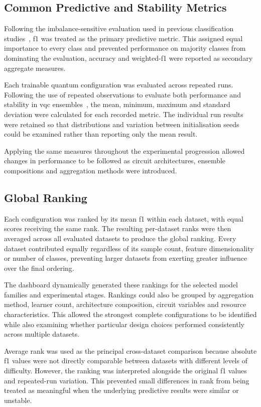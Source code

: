 \documentclass[]{UCD_CS_MSc_AAI_Report}
\begin{document}
\subsection{Common Predictive and Stability Metrics}

Following the imbalance-sensitive evaluation used in previous classification studies~\cite{demir_modified_2018,vasan_exploring_2025}, \acl{f1} was treated as the primary predictive metric. This assigned equal importance to every class and prevented performance on majority classes from dominating the evaluation, accuracy and weighted-\acs{f1} were reported as secondary aggregate measures.

Each trainable quantum configuration was evaluated across repeated runs. Following the use of repeated observations to evaluate both performance and stability in \ac{vqc} ensembles~\cite{radojicic_reducing_2026}, the mean, minimum, maximum and standard deviation were calculated for each recorded metric. The individual run results were retained so that distributions and variation between initialisation seeds could be examined rather than reporting only the mean result.

Applying the same measures throughout the experimental progression allowed changes in performance to be followed as circuit architectures, ensemble compositions and aggregation methods were introduced.

\subsection{Global Ranking}

Each configuration was ranked by its mean \acl{f1} within each dataset, with equal scores receiving the same rank. The resulting per-dataset ranks were then averaged across all evaluated datasets to produce the global ranking. Every dataset contributed equally regardless of its sample count, feature dimensionality or number of classes, preventing larger datasets from exerting greater influence over the final ordering.

The dashboard dynamically generated these rankings for the selected model families and experimental stages. Rankings could also be grouped by aggregation method, learner count, architecture composition, circuit variables and resource characteristics. This allowed the strongest complete configurations to be identified while also examining whether particular design choices performed consistently across multiple datasets.

Average rank was used as the principal cross-dataset comparison because absolute \acl{f1} values were not directly comparable between datasets with different levels of difficulty. However, the ranking was interpreted alongside the original \acl{f1} values and repeated-run variation. This prevented small differences in rank from being treated as meaningful when the underlying predictive results were similar or unstable.
\end{document}
